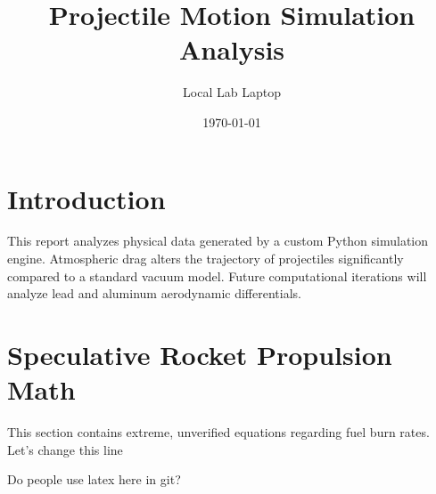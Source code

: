 \documentclass{article}
\title{Projectile Motion Simulation Analysis}
\author{Local Lab Laptop}
\date{\today}
\begin{document}
\maketitle

\section{Introduction}
This report analyzes physical data generated by a custom Python simulation engine.
Atmospheric drag alters the trajectory of projectiles significantly compared to a standard vacuum model.
Future computational iterations will analyze lead and aluminum aerodynamic differentials.

\section{Speculative Rocket Propulsion Math}
This section contains extreme, unverified equations regarding fuel burn rates.
Let's change this line

Do people use latex here in git?
\end{document}
